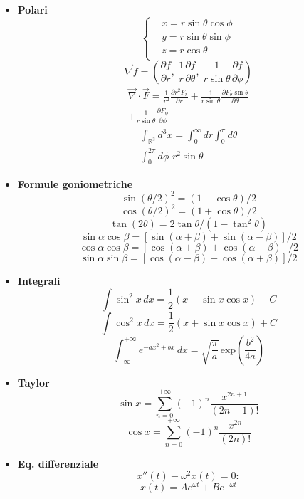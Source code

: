 \documentclass{article}
\begin{document}
\begin{small}
\begin{multicols*}{3}
\begin{itemize}[leftmargin=*]
	\item \textbf{Polari}
		\[
			\left\{\begin{aligned}
				&x= r\sin\theta \cos\phi\\ 
				&y= r\sin\theta \sin\phi \\
				&z= r\cos\theta \\
			\end{aligned}\right.
		\]
		\[\vec{\nabla} f = \left(\frac{\partial f}{\partial r},\ \frac{1}{r}\frac{\partial f}{\partial \theta },\ \frac{1}{r\sin\theta}\frac{\partial f}{\partial \phi }\right)\]
		\begin{align*}\vec{\nabla} \cdot \vec{F} = \frac{1}{r^2}\frac{\partial r^2F_r}{\partial r} + \frac{1}{r\sin\theta }\frac{\partial F_\theta \sin\theta }{\partial \theta }\\ + \frac{1}{r\sin\theta }\frac{\partial F_\phi }{\partial \phi }\end{align*}
		\begin{align*}\int_{\mathbb{R}^3}d^3x = \int_{0}^{\infty }dr \int_{0}^{\pi }d\theta \\ \int_{0}^{2\pi }d\phi \,\, r^2 \sin\theta \end{align*}

	\item \textbf{Formule goniometriche}
		\[\sin(\theta /2)^2 = (1-\cos\theta )/2\]
		\[\cos(\theta /2)^2 = (1+\cos\theta )/2\]
		\[\tan(2\theta ) = 2\tan\theta /(1-\tan^2\theta )\]
		\[\sin\alpha \cos\beta = [\sin(\alpha +\beta )+\sin(\alpha -\beta )]/2\]
		\[\cos\alpha \cos\beta = [\cos(\alpha +\beta )+\cos(\alpha -\beta )]/2\]
		\[\sin\alpha \sin\beta = [\cos(\alpha -\beta )+\cos(\alpha +\beta )]/2\]

	\item \textbf{Integrali}
		\[\int \sin^2 x \,dx = \frac{1}{2}(x-\sin x\cos x) + C\]
		\[\int \cos^2 x \,dx = \frac{1}{2}(x+\sin x\cos x) + C\]
		\[\int_{-\infty }^{+\infty } e^{-ax^2+bx}\,dx = \sqrt{\frac{\pi }{a}}\, \mathrm{exp}\left(\frac{b^2}{4a}\right)\]

	\item \textbf{Taylor}
		\[\sin x = \sum_{n=0}^{+\infty }(-1)^n \frac{x^{2n+1}}{(2n+1)!}\]
		\[\cos x = \sum_{n=0}^{+\infty }(-1)^n \frac{x^{2n}}{(2n)!}\]

	\item \textbf{Eq. differenziale}
		\[x''(t)-\omega ^2x(t) = 0:\]
		\[x(t) = Ae^{\omega t} + Be^{-\omega t}\]
\end{itemize}
\end{multicols*}
\end{small}
\end{document}
